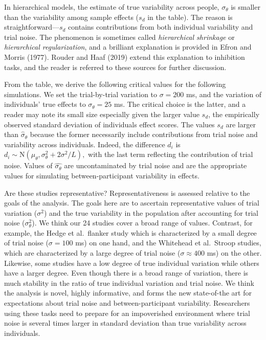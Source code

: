 \documentclass[
  ,man]{apa6}
\begin{document}
In hierarchical models, the estimate of true variability across people, \(\sigma_\theta\) is smaller than the variability among sample effects (\(s_d\) in the table). The reason is straightforward---\(s_d\) contains contributions from both individual variability and trial noise. The phenomenon is sometimes called \emph{hierarchical shrinkage} or \emph{hierarchical regularization}, and a brilliant explanation is provided in Efron and Morris (1977). Rouder and Haaf (2019) extend this explanation to inhibition tasks, and the reader is referred to these sources for further discussion.

From the table, we derive the following critical values for the following simulations. We set the trial-by-trial variation to \(\sigma= 200\) ms, and the variation of individuals' true effects to \(\sigma_\theta=25\) ms. The critical choice is the latter, and a reader may note its small size especially given the larger value \(s_d\), the empirically observed standard deviation of individuals effect scores. The values \(s_d\) are larger than \(\hat{\sigma}_\theta\) because the former necessarily include contributions from trial noise and variability across individuals. Indeed, the difference \(d_i\) is \(d_i\sim \mbox{N}(\mu_\theta,\sigma^2_\theta+2\sigma^2/L),\) with the last term reflecting the contribution of trial noise. Values of \(\hat{\sigma_\theta}\) are uncontaminated by trial noise and are the appropriate values for simulating between-participant variability in effects.

Are these studies representative? Representativeness is assessed relative to the goals of the analysis. The goals here are to ascertain representative values of trial variation (\(\sigma^2\)) and the true variability in the population after accounting for trial noise (\(\sigma^2_\theta\)). We think our 24 studies cover a broad range of values. Contrast, for example, the Hedge et al.~flanker study which is characterized by a small degree of trial noise (\(\sigma=100\) ms) on one hand, and the Whitehead et al.~Stroop studies, which are characterized by a large degree of trial noise (\(\sigma \approx 400\) ms) on the other. Likewise, some studies have a low degree of true individual variation while others have a larger degree. Even though there is a broad range of variation, there is much stability in the ratio of true individual variation and trial noise. We think the analysis is novel, highly informative, and forms the new state-of-the art for expectations about trial noise and between-participant variability. Researchers using these tasks need to prepare for an impoverished environment where trial noise is several times larger in standard deviation than true variability across individuals.
\end{document}
